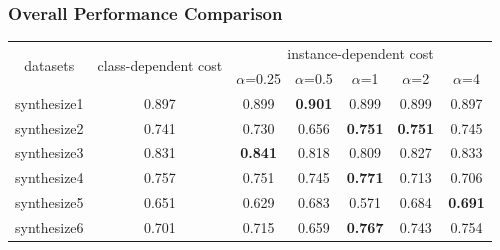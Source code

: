 \documentclass{article}
\begin{document}
\subsubsection{Overall Performance Comparison}

\begin{table}[!ht]
	\centering
	\begin{tabular}{|c||c|ccccc|}
		\hline
		\multirow{2}{*}{datasets} & \multirow{2}{*}{class-dependent cost} & \multicolumn{5}{c|}{instance-dependent cost}                                                                                                                           \\ \cline{3-7} 
		&                                       & \multicolumn{1}{c|}{$\alpha$=0.25}         & \multicolumn{1}{c|}{$\alpha$=0.5}          & \multicolumn{1}{c|}{$\alpha$=1}            & \multicolumn{1}{c|}{$\alpha$=2}            & $\alpha$=4            \\ \hline \hline
		synthesize1               & 0.897                                 & \multicolumn{1}{c|}{0.899}          & \multicolumn{1}{c|}{\textbf{0.901}} & \multicolumn{1}{c|}{0.899}          & \multicolumn{1}{c|}{0.899}          & 0.897          \\ \hline
		synthesize2               & 0.741                                 & \multicolumn{1}{c|}{0.730}          & \multicolumn{1}{c|}{0.656}          & \multicolumn{1}{c|}{\textbf{0.751}} & \multicolumn{1}{c|}{\textbf{0.751}} & 0.745          \\ \hline
		synthesize3               & 0.831                                 & \multicolumn{1}{c|}{\textbf{0.841}} & \multicolumn{1}{c|}{0.818}          & \multicolumn{1}{c|}{0.809}          & \multicolumn{1}{c|}{0.827}          & 0.833          \\ \hline
		synthesize4               & 0.757                                 & \multicolumn{1}{c|}{0.751}          & \multicolumn{1}{c|}{0.745}          & \multicolumn{1}{c|}{\textbf{0.771}} & \multicolumn{1}{c|}{0.713}          & 0.706          \\ \hline
		synthesize5               & 0.651                                 & \multicolumn{1}{c|}{0.629}          & \multicolumn{1}{c|}{0.683}          & \multicolumn{1}{c|}{0.571}          & \multicolumn{1}{c|}{0.684}          & \textbf{0.691} \\ \hline
		synthesize6               & 0.701                                 & \multicolumn{1}{c|}{0.715}          & \multicolumn{1}{c|}{0.659}          & \multicolumn{1}{c|}{\textbf{0.767}} & \multicolumn{1}{c|}{0.743}          & 0.754          \\ \hline

\end{tabular}
\end{table}
\end{document}
